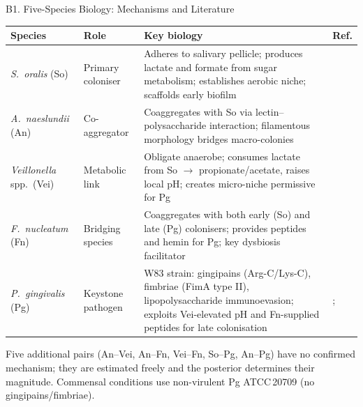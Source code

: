 \documentclass[aspectratio=169,10pt,t]{beamer}
\begin{document}
\begin{frame}[t]{B1. Five-Species Biology: Mechanisms and Literature}
  \small\vspace{-2pt}
  \renewcommand{\arraystretch}{1.12}
  \begin{tabular}{@{}p{1.1cm}p{1.5cm}p{6.4cm}p{2.0cm}@{}}
    \toprule
    \textbf{Species} & \textbf{Role} & \textbf{Key biology} & \textbf{Ref.}\\
    \midrule
    \textit{S.\ oralis} (So)
      & Primary coloniser
      & Adheres to salivary pellicle; produces lactate and formate from
        sugar metabolism; establishes aerobic niche; scaffolds early biofilm
      & \cite{Kolenbrander2010OralMultispecies}\\
    \textit{A.\ naeslundii} (An)
      & Co-aggregator
      & Coaggregates with So via lectin--polysaccharide interaction;
        filamentous morphology bridges macro-colonies
      & \cite{Kolenbrander2010OralMultispecies}\\
    \textit{Veillonella} spp.\ (Vei)
      & Metabolic link
      & Obligate anaerobe; consumes lactate from So $\to$ propionate/acetate,
        raises local pH; creates micro-niche permissive for Pg
      & \cite{Kolenbrander2010OralMultispecies}\\
    \textit{F.\ nucleatum} (Fn)
      & Bridging species
      & Coaggregates with both early (So) and late (Pg) colonisers;
        provides peptides and hemin for Pg; key dysbiosis facilitator
      & \cite{Kolenbrander2010OralMultispecies}\\
    \textit{P.\ gingivalis} (Pg)
      & Keystone pathogen
      & W83 strain: gingipains (Arg-C/Lys-C), fimbriae (FimA type II),
        lipopolysaccharide immunoevasion;
        exploits Vei-elevated pH and Fn-supplied peptides for late colonisation
      & \cite{Mukherjee2025PgTitanium};\
        \cite{Heine2025PeriImplant}\\
    \bottomrule
  \end{tabular}
  \vspace{4pt}
  {\scriptsize\color{midgray}
   Five additional pairs (An--Vei, An--Fn, Vei--Fn, So--Pg, An--Pg) have no confirmed
   mechanism; they are estimated freely and the posterior determines their magnitude.
   Commensal conditions use non-virulent Pg ATCC\,20709 (no gingipains/fimbriae).}
\end{frame}
\end{document}
